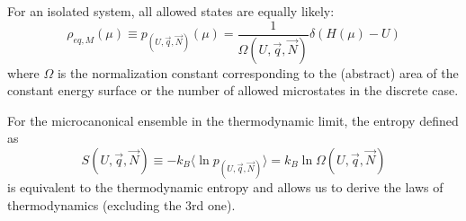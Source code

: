 \documentclass[12pt, a4paper, oneside, openright, titlepage]{book}
\begin{document}
\begin{axi} 
    For an isolated system, all allowed states are equally likely: \begin{equation*}
        \rho_{eq,M}(\mu) \equiv p_{(U,\vec{q},\vec{N})}(\mu) = \frac{1}{\Omega(U,\vec{q},\vec{N})}\delta(H(\mu) - U)
    \end{equation*}
    where $\Omega$ is the normalization constant corresponding to the (abstract) area of the constant energy surface or the number of allowed microstates in the discrete case.
\end{axi}


\begin{thm}
    For the microcanonical ensemble in the thermodynamic limit, the  entropy defined as \begin{equation*}
        S(U,\vec{q},\vec{N}) \equiv -k_B\langle \ln p_{(U,\vec{q},\vec{N})}\rangle = k_B\ln\Omega(U,\vec{q},\vec{N})
    \end{equation*}
    is equivalent to the thermodynamic entropy and allows us to derive the laws of thermodynamics (excluding the 3rd one).
\end{thm}
\end{document}
